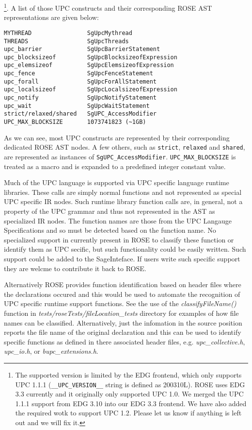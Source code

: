 \footnote{
The supported version is limited by the EDG
frontend, which only supports UPC 1.1.1 (\lstinline{__UPC_VERSION__} string
is defined as 200310L).
ROSE uses EDG 3.3 currently and it originally only supported UPC 1.0.
We merged the UPC 1.1.1 support from EDG 3.10 into our EDG 3.3 frontend. 
We have also added the required wotk to support UPC 1.2. Please let us know if anything is
left out and we will fix it.}.
A list of those UPC constructs and their corresponding ROSE AST representations are given below:
\begin{verbatim}
MYTHREAD                SgUpcMythread
THREADS                 SgUpcThreads
upc_barrier             SgUpcBarrierStatement
upc_blocksizeof         SgUpcBlocksizeofExpression
upc_elemsizeof          SgUpcElemsizeofExpression
upc_fence               SgUpcFenceStatement
upc_forall              SgUpcForAllStatement
upc_localsizeof         SgUpcLocalsizeofExpression
upc_notify              SgUpcNotifyStatement
upc_wait                SgUpcWaitStatement
strict/relaxed/shared   SgUPC_AccessModifier
UPC_MAX_BLOCKSIZE       1073741823 (~1GB)
\end{verbatim}
As we can see, most UPC constructs are represented by their corresponding dedicated ROSE AST nodes. 
A few others, such as \lstinline{strict}, \lstinline{relaxed} and
\lstinline{shared}, are represented as instances of \lstinline{SgUPC_AccessModifier}.
\lstinline{UPC_MAX_BLOCKSIZE} is treated as a macro and is expanded to a predefined integer constant value.

Much of the UPC language is supported via UPC specific language runtime
libraries.  These calls are simply normal functions and not represented 
as special UPC specific IR nodes.  
Such runtime library function calls are, in general, 
not a property of the UPC grammar and thus not represented in the AST 
as specialized IR nodes.
The function names are those from the 
UPC Langauge Specifications and so must be detected based on the function
name.  No specialized support in currently present in ROSE to classify 
these function or identify them as UPC secific, but such functionality
could be easily written. Such support could be added to the SageInteface.
If users write such specific support they are welcme to contribute it 
back to ROSE.

Alternatively ROSE provides function identification based on header files
where the declarations occured and this would be used to automate the recognition of UPC 
specific runtime support functions.  See the use of the {\em classifyFileName()}
function in {\em tests/roseTests/fileLocation\_tests}
directory for examples of how file names can be classified.  Alternatively,
just the infomation in the source position reports the file name of the
original declaration and this can be used to identify specific functions as 
defined in there associated header files, e.g. {\em upc\_collective.h}, 
{\em upc\_io.h}, or {\em bupc\_extensions.h}.


